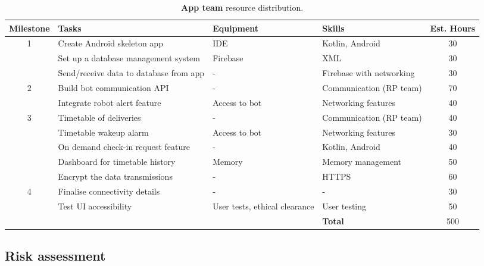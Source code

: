 \documentclass{article}
\begin{document}
\begin{table*}[]
  \begin{center}
  \begin{small}
  \begin{tabular}{|c|l|l|l|c|}
    \hline
    {\bf Milestone} & {\bf Tasks} & {\bf Equipment} & {\bf Skills} & {\bf Est. Hours} \\ \hline
    1               & Create Android skeleton app & IDE & Kotlin, Android & 30\\ \cline{2-5}
                    & Set up a database management system & Firebase & XML & 30\\ \cline{2-5}
                    & Send/receive data to database from app & - & Firebase with networking & 30\\ \hline
    2               & Build bot communication API & - & Communication (RP team) & 70\\ \cline{2-5}
                    & Integrate robot alert feature & Access to bot & Networking features & 40\\ \hline
    3               & Timetable of deliveries & - & Communication (RP team) & 40\\ \cline{2-5}
                    & Timetable wakeup alarm & Access to bot & Networking features & 30\\ \cline{2-5}
                    & On demand check-in request feature & - & Kotlin, Android & 40\\ \cline{2-5}
                    & Dashboard for timetable history & Memory & Memory management & 50\\ \cline{2-5}
                    & Encrypt the data transmissions & - & HTTPS & 60\\ \hline
    4               & Finalise connectivity details & - & - & 30\\ \cline{2-5}
                    & Test UI accessibility & User tests, ethical clearance & User testing & 50\\ \hline
                    &                           &  & {\bf Total} & 500 \\ \hline
  \end{tabular}
  \end{small}
  \caption{{\bf App team} resource distribution.}
  \label{tab:app-rd}
  \end{center}
\end{table*}


\subsection{Risk assessment} 
\end{document}
